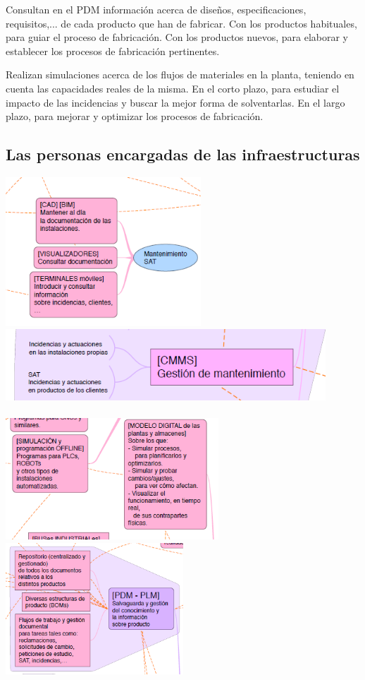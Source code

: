 \documentclass[spanish,12pt,a4paper,final,oneside]{book}
\begin{document}
Consultan en el PDM información acerca de diseños, especificaciones, requisitos,... de cada producto que han de fabricar. Con los productos habituales, para guiar el proceso de fabricación. Con los productos nuevos, para elaborar y establecer los procesos de fabricación pertinentes.

Realizan simulaciones acerca de los flujos de materiales en la planta, teniendo en cuenta las capacidades reales de la misma. En el corto plazo, para estudiar el impacto de las incidencias y buscar la mejor forma de solventarlas. En el largo plazo, para mejorar y optimizar los procesos de fabricación.

\subsection{Las personas encargadas de las infraestructuras}
\includegraphics[width=0.55\textwidth]{subesquema - infraestructuras01}
\\ \includegraphics[width=0.9\textwidth]{subesquema - infraestructuras02}
\\\\ \includegraphics[width=0.6\textwidth]{subesquema - infraestructuras04}
\\ \includegraphics[width=0.5\textwidth]{subesquema - infraestructuras03}
\end{document}
